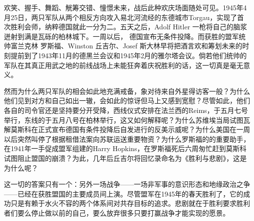 欢笑、握手、舞蹈、觥筹交错、憧憬未来，战后此种欢庆场面随处可见。1945年4月25日，两只军队从两个相反方向攻入易北河流经的东德城市Torgau，实现了首次胜利会师，纳粹德国就此一分为二。五天之后，Adolf Hitler 一枪将自己的脑浆迸射到满是瓦砾的柏林城下。一周以后， 德国宣布无条件投降。而获胜的盟军统帅富兰克林 罗斯福、Winston 丘吉尔、Josef 斯大林早将把酒言欢和筹划未来的时刻提前到了1943年11月的德黑兰会议和1945年2月的雅尔塔会议。倘若他们统帅的军队在其真正用武之地的前线战场上未能狂奔着庆祝胜利的话，这一切真是毫无意义。

然而为什么两只军队的相会如此地充满戒备，象对待来自外星得访客一般？为什么他们见到对方和自己如出一辙，会如此的惊讶但马上又感到宽慰？尽管如此，他们各自的司令官还是坚持要分开受降，西线仪式安排在法兰西的Reims，于五月七号举行，东线的于五月八号在柏林举行，这又如何解释呢？为什么苏维埃当局试图瓦解莫斯科在正式宣布德国有条件投降后自发进行的反美示威呢？为什么美国在一周以后突然叫停了根据租借法案向苏联运送重要物资？为什么罗斯福的的重要助手，在1941年一手促成盟军组建的Harry Hopkins，在罗斯福死后六周匆忙赶到莫斯科试图阻止盟国的崩溃？为此，几年后丘吉尔将回忆录命名为《胜利与悲剧》，这是为什么呢？

这一切的答案只有一个：另外一场战争——一场非军事的意识形态和地缘政治之争——已经在获胜盟国的主要成员间上演。尽管盟军在1945年的春天胜利了，它的成功只是有赖于水火不容的两个体系间对共存目标的追求。悲剧就在于胜利要求胜利者们要么停止做以前的自己，要么放弃很多只要打赢战争才能实现的愿景。